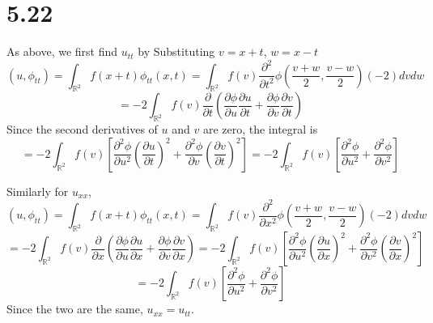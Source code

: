 \message{ !name(hw2.tex)}\documentclass{article}
\begin{document}
\section*{5.22}
As above, we first find $u_{tt}$ by Substituting $v=x+t$, $w=x-t$
\[(u, \phi_{tt})=\int_{\mathbb{R}^2}f(x+t)\phi_{tt}(x,t)=\int_{\mathbb{R}^2}f(v)\frac{\partial^2}{\partial t^2} \phi\left(\frac{v+w}{2},\frac{v-w}{2}\right)(-2)dvdw\]
\[=-2\int_{\mathbb{R}^2}f(v)\frac{\partial}{\partial t}\left( \frac{\partial \phi}{\partial u}\frac{\partial u}{\partial t}+\frac{\partial \phi}{\partial v}\frac{\partial v}{\partial t} \right)\]
Since the second derivatives of $u$ and $v$ are zero, the integral is
\[=-2\int_{\mathbb{R}^2}f(v)\left[ \frac{\partial^2\phi}{\partial u^2}\left( \frac{\partial u}{\partial t} \right)^2+\frac{\partial^2\phi}{\partial v}\left( \frac{\partial v}{\partial t} \right)^2 \right]=-2\int_{\mathbb{R}^2}f(v)\left[ \frac{\partial^2\phi}{\partial u^2}+\frac{\partial^2\phi}{\partial v^2} \right]\]

Similarly for $u_{xx}$,
\[(u,\phi_{tt})=\int_{\mathbb{R}^2}f(x+t)\phi_{tt}(x,t)=\int_{\mathbb{R}^2}f(v)\frac{\partial^2}{\partial x^2}\phi\left(\frac{v+w}{2},\frac{v-w}{2}\right)(-2)dvdw\]
\[=-2\int_{\mathbb{R}^2}f(v)\frac{\partial}{\partial x}\left(\frac{\partial \phi}{\partial u}\frac{\partial u}{\partial x}+\frac{\partial \phi}{\partial v}\frac{\partial v}{\partial x}  \right)=-2\int_{\mathbb{R}^2}f(v)\left[ \frac{\partial^2\phi}{\partial u^2}\left( \frac{\partial u}{\partial x} \right)^2+\frac{\partial^2 \phi}{\partial v^2}\left( \frac{\partial v}{\partial x} \right)^2 \right]\]
\[=-2\int_{\mathbb{R}^2}f(v)\left[  \frac{\partial^2\phi}{\partial u^2}+\frac{\partial^2\phi}{\partial v^2}\right]\]
Since the two are the same, $u_{xx}=u_{tt}$.
\end{document}
